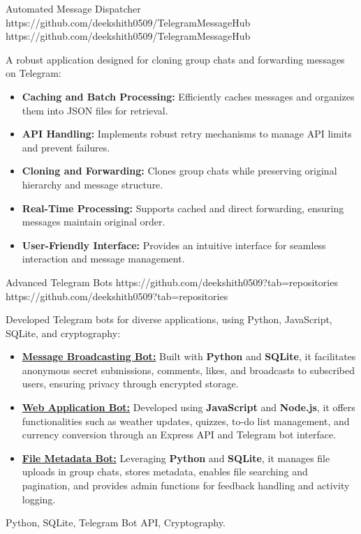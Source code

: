 \documentclass[a4paper,10pt]{article}
\begin{document}
\vspace{10pt}
\projectentry
{Automated Message Dispatcher}
{https://github.com/deekshith0509/TelegramMessageHub}
{https://github.com/deekshith0509/TelegramMessageHub}
{A robust application designed for cloning group chats and forwarding messages on Telegram:
\begin{itemize}
\item \textbf{Caching and Batch Processing:} Efficiently caches messages and organizes them into JSON files for retrieval.
\item \textbf{API Handling:} Implements robust retry mechanisms to manage API limits and prevent failures.
\item \textbf{Cloning and Forwarding:} Clones group chats while preserving original hierarchy and message structure.
\item \textbf{Real-Time Processing:} Supports cached and direct forwarding, ensuring messages maintain original order.
\item \textbf{User-Friendly Interface:} Provides an intuitive interface for seamless interaction and message management.
\end{itemize}
}{} 


\vspace{10pt}
\projectentry
{Advanced Telegram Bots}
{https://github.com/deekshith0509?tab=repositories}
{https://github.com/deekshith0509?tab=repositories}
{Developed Telegram bots for diverse applications, using Python, JavaScript, SQLite, and cryptography:
\begin{itemize}
\item \textbf{\href{https://github.com/deekshith0509/MessageBroadcasting_Bot}{Message Broadcasting Bot:}} Built with \textbf{Python} and \textbf{SQLite}, it facilitates anonymous secret submissions, comments, likes, and broadcasts to subscribed users, ensuring privacy through encrypted storage.
\item \textbf{\href{https://github.com/deekshith0509/WebApplication_Bot}{Web Application Bot:}} Developed using \textbf{JavaScript} and \textbf{Node.js}, it offers functionalities such as weather updates, quizzes, to-do list management, and currency conversion through an Express API and Telegram bot interface.
\item \textbf{\href{https://github.com/deekshith0509/Fileforwardbot}{File Metadata Bot:}} Leveraging \textbf{Python} and \textbf{SQLite}, it manages file uploads in group chats, stores metadata, enables file searching and pagination, and provides admin functions for feedback handling and activity logging.
\end{itemize}
}{Python, SQLite, Telegram Bot API, Cryptography.}
\vspace{10pt}
\end{document}
